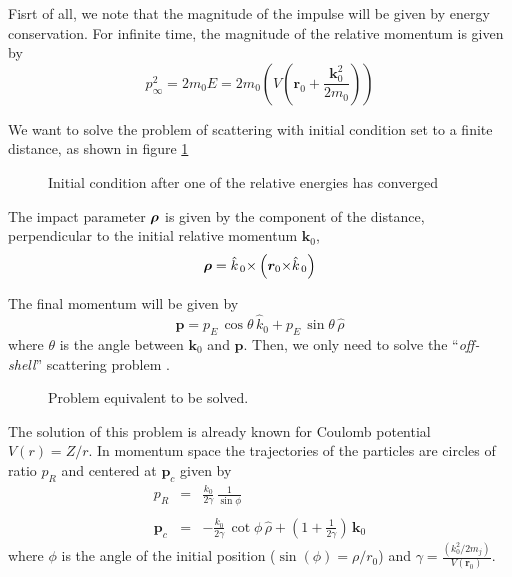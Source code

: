 Fisrt of all, we note that the magnitude of the impulse will be given by energy conservation. For infinite time, the magnitude of the relative momentum is given by
\begin{equation}
  \label{Q:ctmc_magnitude}
p_{\infty}^{2}= 2 m_{0} E = 2 m_{0} \left(V(\bm{r}_{0} + \frac{\bm{k}^{2}_{0}}{2 m_{0}})  \right)
\end{equation}

We want to solve the problem of scattering with initial condition set
to a finite distance, as shown in figure \ref{f:cond-in}

\begin{figure}[h]\label{f:cond-in}
\centering
\caption{Initial condition after one of the relative energies has
converged}
\end{figure}


The impact parameter $\boldsymbol{\rho}$ is given by the component of the distance,
perpendicular to the initial relative momentum $\bm{k}_{0}$,
\begin{equation}\label{Q:rho}
\boldsymbol{\rho} = \hat{k}_{\,0} {\times} \left( \bm{r}_{0} {\times} \hat{k}_{\,0} \right)
\end{equation}

The final momentum will be given by
\begin{equation}\label{Q:finalmom}
\bm{p} = p_{E} \, \cos{\theta} \, \hat{k}_{0}+ p_{E}\, \sin{\theta}\,
\hat{\rho}
\end{equation}
%
where $\theta $ is the angle between $\bm{k}_{0}$ and $\bm{p}$. Then,
we only need to solve the ``\textit{off-shell}'' scattering problem
\cite{Fiol2000JPBp2847}.

\begin{figure}[!htpb]
  \centering
  \caption{Problem equivalent to be solved.
  \label{f:ctmc1}}
\end{figure}


The solution of this problem is already known for Coulomb potential
$V(r) = Z/r$. In momentum space the trajectories of the particles are
circles of ratio $p_{R}$ and centered at $\bm{p}_{c}$ given by
\begin{eqnarray}\label{Q:circle-mom}
p_{R} &=& \frac{k_{0}}{2 \gamma} \, \frac{1}{\sin{\phi}} \nonumber \\
\\
\bm{p}_{c} &=& - \frac{k_{0}}{2 \gamma } \, \cot{\phi}\, \hat{\rho} +
\left( 1 + \frac{1}{2 \gamma} \right) \, \bm{k}_{0} \nonumber
\end{eqnarray}
where $\phi$ is the angle of the initial position ($\sin(\phi) =
\rho/r_{0}$) and $\displaystyle{\gamma = \frac{\left( k_{0}^{2}/2 m_{j}
\right)}{V(\bm{r}_{0})}}$.

